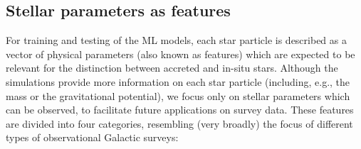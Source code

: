 \subsection{Stellar parameters as features}
\label{sec:feature_selection}

For training and testing of the ML models, each star particle is described as a vector of physical parameters (also known as features) which are expected to be relevant for the distinction between accreted and in-situ stars. Although the simulations provide more information on each star particle (including, e.g., the mass or the gravitational potential), we focus only on stellar parameters which can be observed, to facilitate future applications on survey data. These features are divided into four categories, resembling (very broadly) the focus of different types of observational Galactic surveys:

